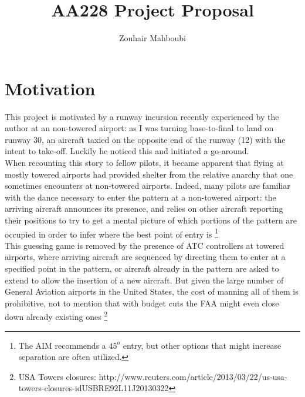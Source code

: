 \documentclass[english]{article}
\title{AA228 Project Proposal\\}
\author{Zouhair Mahboubi}
\begin{document}
 
\maketitle 
\newpage 
\lstset{basicstyle=\footnotesize, breaklines=true, language=Octave}

\section{Motivation}
This project is motivated by a runway incursion recently experienced by the author at an non-towered airport: as I was turning base-to-final to land on runway 30, an aircraft taxied on the opposite end of the runway (12) with the intent to take-off. Luckily he noticed this and initiated a go-around.\\

When recounting this story to fellow pilots, it became apparent that flying at mostly towered airports had provided shelter from the relative anarchy that one sometimes encounters at non-towered airports. Indeed, many pilots are familiar with the dance necessary to enter the pattern at a non-towered airport: the arriving aircraft announces its presence, and relies on other aircraft reporting their positions to try to get a mental picture of which portions of the pattern are occupied in order to infer where the best point of entry is \footnote{The AIM recommends a $45^o$ entry, but other options that might increase separation are often utilized.}\\

This guessing game is removed by the presence of ATC controllers at towered airports, where arriving aircraft are sequenced by directing them to enter at a specified point in the pattern, or aircraft already in the pattern are asked to extend to allow the insertion of a new aircraft. But given the large number of General Aviation airports in the United States, the cost of manning all of them is prohibitive, not to mention that with budget cuts the FAA might even close down already existing ones \footnote{USA Towers closures: http://www.reuters.com/article/2013/03/22/us-usa-towers-closures-idUSBRE92L11J20130322}\\
\end{document}
